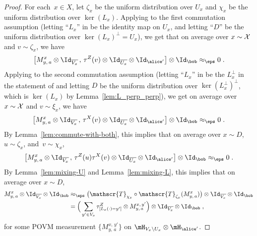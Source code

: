 \begin{proof}
  For each~$x \in X$, let $\zeta_{x}$ be the uniform distribution over $U_x$ and
  $\chi_{x}$ be the uniform distribution over $\ker(L_x)$.
   Applying  to the first commutation assumption (letting ``$L_x$'' in  be the identity map on $U_x$, and letting ``$D$'' be the uniform distribution over $\ker(L_x)^\perp = U_x$), we get that on average over $x \sim \cal{X}$ and $v \sim \zeta_x$, we have
  \begin{equation*}
    \bigl[ M^{x}_{y,\, a} \otimes \Id_{\overline{V_x}} \,,\, \tau^Z(v) \otimes
    \Id_{\overline{U_x}} \otimes \Id_{\alice'} \bigr]  \otimes \Id_\bob
    \approx_\eps 0\;.
  \end{equation*}
  Applying  to the second commutation assumption (letting ``$L_x$'' in  be the $L_x^\perp$ in the statement of  and letting $D$ be the uniform distribution over $\ker(L_x^\perp)^\perp$, which is $\ker(L_x)$ by Lemma~\ref{lem:L_perp_perp}), we get 
on average over $x \sim \cal{X}$ and $v \sim \xi_x$, we have
  \begin{equation*}
    \bigl[ M^{x}_{y,\, a} \otimes \Id_{\overline{V_x}} \,,\, \tau^X(v) \otimes
    \Id_{\overline{U_x}} \otimes \Id_{\alice'} \bigr]  \otimes \Id_\bob
    \approx_\eps 0\;.
  \end{equation*}    
By Lemma~\ref{lem:commute-with-both}, this implies that on average over $x
  \sim D$, $u \sim \zeta_{x}$, and~$v \sim \chi_{x}$,
  \begin{equation*}
    \bigl[ M^{x}_{y,\, a} \otimes \Id_{\overline{V_x}} \,,\, \tau^Z(u) \tau^X(v)
    \otimes \Id_{\overline{U_x}} \otimes \Id_{\alice'} \bigr] \otimes \Id_\bob
    \approx_\eps 0\;.
  \end{equation*}
  By Lemma~\ref{lem:mixing-U} and Lemma~\ref{lem:mixing-L},
  this implies that on average over $x\sim D$,
  \begin{align}
    M^{x}_{y,\, a} \otimes \Id_{\overline{V_x}} \otimes \Id_\bob
    & \approx_\eps \bigl( \mathscr{T}_{\chi_{x}} \circ \mathscr{T}_{\zeta_{x}} (
      M^{x}_{y,\, a}) \bigr) \otimes \Id_{\overline{V_x}} \otimes
      \Id_\bob\notag\\
    & = \Big(\sum_{y' \in V_x} \tau^Z_{[L_x(\cdot) = y']} \otimes  M^{x,\,
      y'}_{y,\, a} \Big) \otimes \Id_{\overline{V_x}} \otimes
      \Id_\bob\;,\label{eq:mixing-eq-1}
  \end{align}
	for some POVM measurement $\{M^{x,\, y'}_{y,\, a} \}$ on $\mH_{V_x \setminus
    U_x} \otimes \mH_{\alice'}$.
	

\end{proof}
